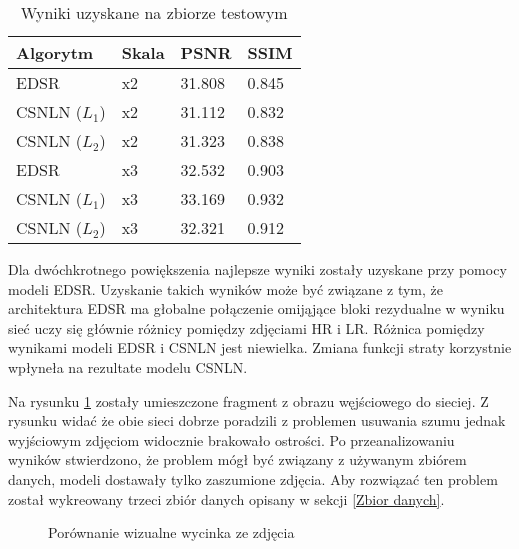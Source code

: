 \documentclass[a4paper,12pt,twoside,openany]{report}
\newcommand{\ImgPath}{.}
\begin{document}
\begin{table}[!htbp] 
	\centering
	\begin{tabular}{ |p{3cm}||p{2cm}|p{2cm}|p{2cm}|  }
		\hline
		Algorytm 							      & Skala   & PSNR      & SSIM \\
		\hline
		EDSR                                      &   x2	& 31.808	& 0.845\\
		CSNLN  ($L_1$)  						  &   x2	& 31.112	& 0.832\\
		CSNLN ($L_2$)  							  &   x2	& 31.323	& 0.838\\
		\hline
		EDSR                                      &   x3	& 32.532	& 0.903\\
		CSNLN ($L_1$) 						      &   x3	& 33.169	& 0.932\\
		CSNLN ($L_2$)  							  &   x3	& 32.321	& 0.912\\
		\hline
		
	\end{tabular}
	\caption{Wyniki uzyskane na zbiorze testowym}
	\label{TabelaShum}
\end{table}

Dla dwóchkrotnego powiększenia najlepsze wyniki zostały uzyskane przy pomocy  modeli EDSR. Uzyskanie takich wyników może  być związane z tym, że architektura   EDSR  ma  głobalne połączenie omijąjące bloki rezydualne w wyniku sieć uczy  się głównie  różnicy pomiędzy zdjęciami HR i LR. Różnica pomiędzy wynikami modeli EDSR i CSNLN jest niewielka. Zmiana funkcji straty  korzystnie wpłyneła  na rezultate modelu CSNLN. 

Na  rysunku \ref{fig:cropShum} zostały umieszczone fragment z obrazu węjściowego do sieciej. Z rysunku widać że obie sieci dobrze poradzili z problemen usuwania szumu jednak wyjściowym zdjęciom widocznie brakowało  ostrości. Po  przeanalizowaniu wyników stwierdzono, że problem mógł być związany z używanym zbiórem danych, modeli dostawały tylko zaszumione zdjęcia. Aby rozwiązać ten problem został wykreowany trzeci zbiór danych opisany w sekcji \ref{Zbior danych}. 

\begin{figure}[!htbp]
	\centering
	\caption{Porównanie wizualne wycinka ze zdjęcia}
	\label{fig:cropShum}
\end{figure}


\end{document}
